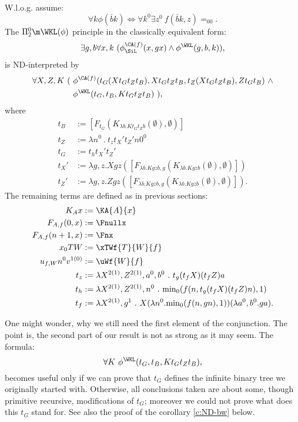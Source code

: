 \begin{prop} \label{p:ND-PI02WKL}
$ $
\\
W.l.o.g. assume:
\[
\forall k\phi(\bar bk) \Leftrightarrow \forall k^0\exists z^0\ f(\bar bk,z)=_00
\text{.}
\]
The $\Pi^0_2\m\WKL(\phi)$ principle in the classically equivalent form:
\[
\exists g,b\forall x,k\ ( \phi^{\CA(f)}_{\SiL}(x,gx)\wedge \phi^{\WKL}(g,b,k) )
\text{,}
\]
is ND-interpreted by
\begin{align*}
\forall X,Z,K\ (\ &\phi^{\CA(f)}(
 t_{G}(Xt_{G}t_{Z}t_{B}),
 Xt_{G}t_{Z}t_{B},
 t_{Z}( Xt_{G}t_{Z}t_{B} ),
 Zt_Gt_{B})\ \wedge\\
 &\phi^{\WKL}(t_{G},t_{B},Kt_{G}t_{Z}t_{B})\ ) \text{,}
\end{align*}
where
\begin{align*}
        t_B    &:= [F_{t_G}(K_{\lambda b.Kt_Gt_Zb}(\emptyset),\emptyset)]\\
        t_Z    &:= \lambda n^0\ .\ t_zt_{X}'t_{Z}'n0^0\\
        t_G    &:= t_ht_{X}'t_{Z}'\\
        t_{X}' &:=\lambda g,z.Xgz( 
                 [F_{\lambda b.Kgzb,g}(K_{\lambda b.Kgzb}(\emptyset),\emptyset)] )\\
        t_{Z}' &:=\lambda g,z.Zgz( 
                 [F_{\lambda b.Kgzb,g}(K_{\lambda b.Kgzb}(\emptyset),\emptyset)] )\text{.}
\end{align*}
The remaining terms are defined as in previous sections:
\begin{align*}
        K_Ax     &:= \KA{A}{x}        \\
        F_{A,f}(0,x)   &:= \Fnullx \\
        F_{A,f}(n+1,x) &:= \Fnx \\
        x_0TW    &:= \xTWf{T}{W}{f}   \\
        u_{f,W}n^0v^{1(0)}  
                 &:= \uWf{W}{f}\\
        t_z      &:=\lambda X^{2(1)},Z^{2(1)},a^0,b^0\ .\ t_g(t_fX)(t_fZ)a\\
        t_h      &:=\lambda X^{2(1)},Z^{2(1)},n^0\ .\ 
                        {\min}_0(f(n,t_g(t_fX)(t_fZ)n),1) \\
        t_f      &:=\lambda X^{2(1)},g^1\ .\ 
                       X(\lambda n^0 . {\min}_0(f(n,gn),1) )(\lambda a^0,b^0 . ga) 
\text{.}
\end{align*}
\end{prop}

\begin{rmk}
One might wonder, why we still need the first element of the conjunction.
The point is, the second part of our result is not as strong as it may seem. 
The formula:
\[
\forall K\ \phi^{\WKL}(t_{G},t_{B},Kt_{G}t_{Z}t_{B}) \text{,}
\]
becomes useful only if we can prove that $t_{G}$ defines the 
infinite binary tree we originally started with. 
Otherwise, all conclusions taken are about some, though primitive recursive, 
modifications of $t_G$; moreover we could not prove what does this $t_G$ stand for. 
See also the proof of the corollary \ref{c:ND-bw} below.
\end{rmk}

